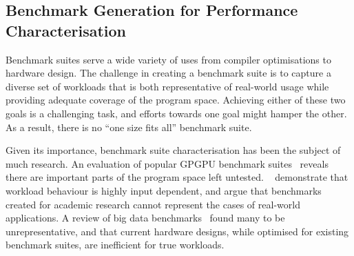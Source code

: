 \subsection{Benchmark Generation for Performance Characterisation}

Benchmark suites serve a wide variety of uses from compiler optimisations to hardware design. The challenge in creating a benchmark suite is to capture a diverse set of workloads that is both representative of real-world usage while providing adequate coverage of the program space. Achieving either of these two goals is a challenging task, and efforts towards one goal might hamper the other. As a result, there is no ``one size fits all'' benchmark suite.

Given its importance, benchmark suite characterisation has been the subject of much research. An evaluation of popular GPGPU benchmark suites~\cite{Ryoo2015} reveals there are important parts of the program space left untested.
\citeauthor{Xiong2013}~\cite{Xiong2013} demonstrate that workload behaviour is highly input dependent, and argue that benchmarks created for academic research cannot represent the cases of real-world applications.
A review of big data benchmarks~\cite{Ferdman2012} found many to be unrepresentative, and that current hardware designs, while optimised for existing benchmark suites, are inefficient for true workloads.

